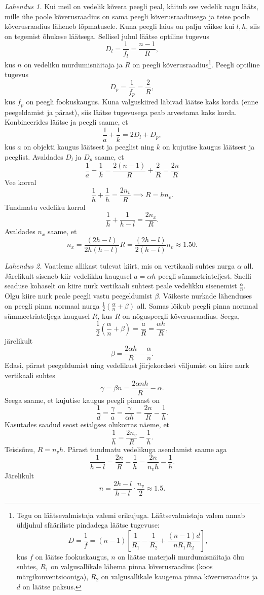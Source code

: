 \documentclass[10pt]{article}
\begin{document}
\solu
\emph{Lahendus 1.} Kui meil on vedelik kõvera peegli peal, käitub see vedelik nagu lääts, mille ühe poole kõverusraadius on sama peegli kõverusraadiusega ja teise poole kõverusraadius läheneb lõpmatusele. Kuna peegli laius on palju väikse kui $l,h$, siis on tegemist õhukese läätsega. Sellisel juhul läätse optiline tugevus
\[
  D_l=\frac{1}{f_l}=\frac{n-1}{R},
\]
kus $n$ on vedeliku murdumisnäitaja ja $R$ on peegli kõverusraadius\footnote{Tegu on läätsevalmistaja valemi erikujuga. Läätsevalmistaja valem annab üldjuhul sfääriliste pindadega läätse tugevuse:
  \[
    D=\frac{1}{f}=(n-1)\left[\frac{1}{R_1}-\frac{1}{R_2}+\frac{(n-1)d}{nR_1R_2}\right],
  \]
  kus $f$ on läätse fookuskaugus, $n$ on läätse materjali murdumisnäitaja õhu suhtes, $R_1$ on valgusallikale lähema pinna kõverusraadius (koos märgikonventsiooniga), $R_2$ on valgusallikale kaugema pinna kõverusraadius ja $d$ on läätse paksus.
}. Peegli optiline tugevus
\[
  D_p=\frac{1}{f_p}=\frac{2}{R},
\]
kus $f_p$ on peegli fookuskaugus. Kuna valguskiired läbivad läätse kaks korda (enne peegeldamist ja pärast), siis läätse tugevusega peab arvestama kaks korda. Konbineerides läätse ja peegli saame, et
\[
  \frac{1}{a}+\frac{1}{k}=2 D_l+D_p,
\]
kus $a$ on objekti kaugus läätsest ja peeglist ning $k$ on kujutise kaugus läätsest ja peeglist. Avaldades $D_l$ ja $D_p$ saame, et
\[
  \frac{1}{a}+\frac{1}{k}=\frac{2(n-1)}{R}+\frac{2}{R}=\frac{2n}{R}
\]
Vee korral
\[
  \frac{1}{h}+\frac{1}{h}=\frac{2 n_v }{R} \implies R=h n_v.
\]
Tundmatu vedeliku korral
\[
  \frac{1}{h}+\frac{1}{h-l}=\frac{2 n_x }{R}.
\]
Avaldades $n_x$ saame, et
\[
  n_x =\frac{(2h-l)}{2h(h-l)} R =\frac{(2h-l)}{2(h-l)} n_v \approx \num{1.50}.
\]

\emph{Lahendus 2.}
Vaatleme allikast tulevat kiirt, mis on vertikaali suhtes nurga $\alpha$ all. Järelikult siseneb kiir vedelikku kaugusel $a = \alpha h$ peegli sümmetriateljest. Snelli seaduse kohaselt on kiire nurk vertikaali suhtest peale vedelikku sisenemist $\frac{\alpha }{n}$. Olgu kiire nurk peale peegli vastu peegeldumist $\beta$. Väikeste nurkade lähenduses on peegli pinna normaal nurga $\frac{1}{2} (\frac{\alpha}{n} + \beta)$ all. Samas lõikub peegli pinna normaal sümmeetriateljega kaugusel $R$, kus $R$ on nõguspeegli kõverusraadius. Seega,
\[
  \frac{1}{2} \left(\frac{\alpha}{n} + \beta\right) = \frac{a}{R} = \frac{\alpha h}{R},
\]
järelikult
\[
  \beta = \frac{2\alpha h}{R} - \frac{\alpha}{n}.
\]
Edasi, pärast peegeldumist ning vedelikust järjekordset väljumist on kiire nurk vertikaali suhtes
\[
  \gamma = \beta n = \frac{2\alpha nh}{R} - \alpha.
\]
Seega saame, et kujutise kaugus peegli pinnast on
\[
  \frac{1}{d} = \frac{\gamma}{a} = \frac{\gamma}{\alpha h} = \frac{2n}{R}- \frac{1}{h}.
\]
Kasutades saadud seost esialgses olukorras näeme, et
\[
  \frac{1}{h} = \frac{2n_v}{R} - \frac{1}{h}.
\]
Teisisõnu, $R = n_v h$. Pärast tundmatu vedelikuga asendamist saame aga
\[
  \frac{1}{h - l} = \frac{2n}{R} - \frac{1}{h} = \frac{2n}{n_v h} - \frac{1}{h}.
\]
Järelikult
\[
  n = \frac{2h-l}{h - l}\cdot  \frac{n_v}{2} \approx \num{1.5}.
\]
\probend
\bigskip
\end{document}
